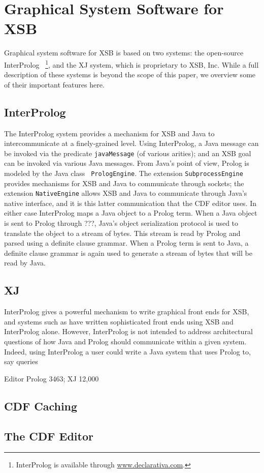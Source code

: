 \section{Graphical System Software for XSB}

Graphical system software for XSB is based on two systems: the
open-source InterProlog \cite{Cale01}~\footnote{InterProlog is
available through \url{www.declarativa.com}.}, and the XJ system,
which is proprietary to XSB, Inc.  While a full description of these
systems is beyond the scope of this paper, we overview some of their
important features here.

\subsection{InterProlog}

The InterProlog system provides a mechanism for XSB and Java to
intercommunicate at a finely-grained level.  Using InterProlog, a Java
message can be invoked via the predicate {\tt javaMessage} (of various
arities); and an XSB goal can be invoked via various Java messages.
From Java's point of view, Prolog is modeled by the Java class {\tt
PrologEngine}.  The extension {\tt SubprocessEngine} provides
mechanisms for XSB and Java to communicate through sockets; the
extension {\tt NativeEngine} allows XSB and Java to communicate
through Java's native interface, and it is this latter communication
that the CDF editor uses.  In either case InterProlog maps a Java
object to a Prolog term.  When a Java object is sent to Prolog {\sc
through ???}, Java's object serialization protocol is used to
translate the object to a stream of bytes.  This stream is read by
Prolog and parsed using a definite clause grammar.  When a Prolog term
is sent to Java, a definite clause grammar is again used to generate a
stream of bytes that will be read by Java.

\subsection{XJ}

InterProlog gives a powerful mechanism to write graphical front ends
for XSB, and systems such as \cite{LMC} have written sophisticated
front ends using XSB and InterProlog alone.  However, InterProlog is
not intended to address architectural questions of how Java and Prolog
should communicate within a given system.  Indeed, using InterProlog a
user could write a Java system that uses Prolog to, say 
queries

Editor Prolog 3463; XJ 12,000

\subsection{CDF Caching}

\subsection{The CDF Editor}


